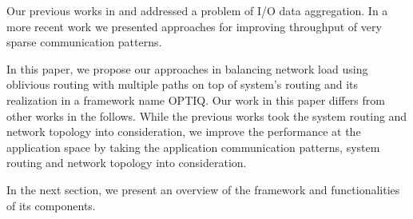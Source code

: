 Our previous works in \cite{Vishwanath:GLEAN} and \cite{SDAV:Bui2014b} addressed a problem of I/O data aggregation. In a more recent work \cite{hbui:bgq} we presented approaches for improving throughput of very sparse communication patterns.

In this paper, we propose our approaches in balancing network load using oblivious routing with multiple paths on top of system's routing and its realization in a framework name OPTIQ. Our work in this paper differs from other works in the follows. While the previous works took the system routing and network topology into consideration, we improve the performance at the application space by taking the application communication patterns, system routing and network topology into consideration. 

In the next section, we present an overview of the framework and functionalities of its components.
